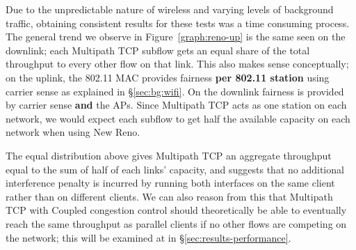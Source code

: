 Due to the unpredictable nature of wireless and varying levels of background
traffic, obtaining consistent results for these tests was a time consuming
process. The general trend we observe in Figure~\ref{graph:reno-up} is the
same seen on the downlink; each Multipath TCP subflow gets an equal
share of the total throughput to every other flow on that link. This also makes
sense conceptually; on the uplink, the 802.11 MAC provides fairness
\textbf{per 802.11 station} using carrier sense as explained in
\S\ref{sec:bg:wifi}. On the downlink fairness is provided by carrier sense
\textbf{and} the APs. Since Multipath TCP acts as one station on each network,
we would expect each subflow to get half the available capacity on each network
when using New Reno.

The equal distribution above gives Multipath TCP an aggregate throughput equal
to the sum of half of each links' capacity, and suggests that no additional interference
penalty is incurred by running both interfaces on the same client rather than on
different clients. We can also reason from this that Multipath TCP with Coupled
congestion control should theoretically be able to eventually reach the same
throughput as parallel clients if no other flows are competing on the network; 
this will be examined at in \S\ref{sec:results-performance}.

